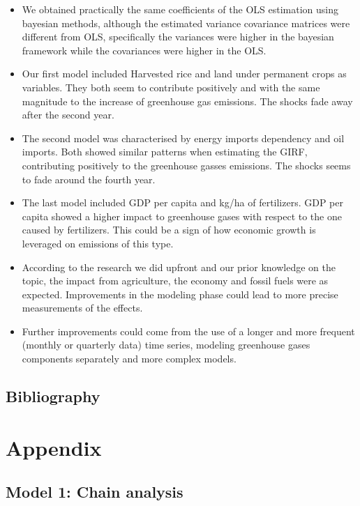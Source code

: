 \documentclass[12pt]{article}
\begin{document}
\begin{itemize}
    \item We obtained practically the same coefficients of the OLS estimation using bayesian methods, although the estimated variance covariance matrices were different from OLS, specifically the variances were higher in the bayesian framework while the covariances were higher in the OLS.
    \item Our first model included Harvested rice and land under permanent crops as variables. They both seem to contribute positively and with the same magnitude to the increase of greenhouse gas emissions. The shocks fade away after the second year.
    \item The second model was characterised by energy imports dependency and oil imports. Both showed similar patterns when estimating the GIRF, contributing positively to the greenhouse gasses emissions. The shocks seems to fade around the fourth year. 
    \item The last model included GDP per capita and kg/ha of fertilizers. GDP per capita showed a higher impact to greenhouse gases with respect to the one caused by fertilizers. This could be a sign of how economic growth is leveraged on emissions of this type.
    \item According to the research we did upfront and our prior knowledge on the topic, the impact from agriculture, the economy and fossil fuels were as expected. Improvements in the modeling phase could lead to more precise measurements of the effects. 
    \item Further improvements could come from the use of a longer and more frequent (monthly or quarterly data) time series, modeling greenhouse gases components separately and more complex models.
\end{itemize}

\clearpage

\begin{center}
    \section{Bibliography}
\end{center}
\printbibliography
\clearpage


\section{Appendix} \label{Appendix}
\subsection{Model 1: Chain analysis}
\end{document}
